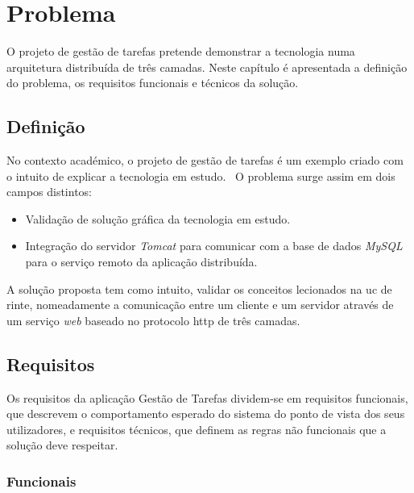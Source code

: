 
\chapter{Problema}	%
\label{Chapter2}	%


\noindent O projeto  de gestão de tarefas pretende demonstrar a tecnologia numa arquitetura distribuída de três camadas. Neste capítulo é apresentada a definição do problema, os requisitos funcionais e técnicos da solução.

\section{Definição}
\label{sec:Ch2.1}

\noindent No contexto académico, o projeto de gestão de tarefas  é um exemplo criado com o intuito de explicar a tecnologia em estudo. ~O problema surge assim em dois campos distintos:
\begin {itemize}
\item Validação de solução gráfica da tecnologia em estudo.
\item Integração do servidor  \textit{Tomcat} para comunicar com a base de dados  \textit{MySQL} para o serviço remoto da aplicação distribuída.
\end {itemize}

\noindent A solução proposta tem como intuito, validar os conceitos lecionados na \ac{uc} de \ac{rinte}, nomeadamente a comunicação entre um cliente e um servidor através de um serviço \textit{web} baseado no protocolo \ac{http} de três camadas.


\section{Requisitos}
\label{sec:Ch2.2}

\noindent Os requisitos da aplicação Gestão de Tarefas dividem-se em requisitos funcionais, que descrevem o comportamento esperado do sistema do ponto de vista dos seus utilizadores, e requisitos técnicos, que definem as regras não funcionais que a solução deve respeitar.

\subsection{Funcionais}


